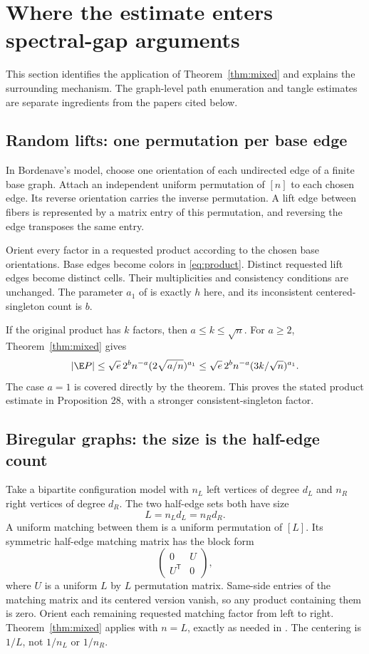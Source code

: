 \section{Where the estimate enters spectral-gap arguments}\label{sec:spectral}

This section identifies the application of Theorem~\ref{thm:mixed} and explains the surrounding mechanism. The graph-level path enumeration and tangle estimates are separate ingredients from the papers cited below.

\subsection{Random lifts: one permutation per base edge}

In Bordenave's model, choose one orientation of each undirected edge of a finite base graph. Attach an independent uniform permutation of $[n]$ to each chosen edge. Its reverse orientation carries the inverse permutation. A lift edge between fibers is represented by a matrix entry of this permutation, and reversing the edge transposes the same entry.

Orient every factor in a requested product according to the chosen base orientations. Base edges become colors in \eqref{eq:product}. Distinct requested lift edges become distinct cells. Their multiplicities and consistency conditions are unchanged. The parameter $a_1$ of \cite[Proposition 28]{Bordenave} is exactly $h$ here, and its inconsistent centered-singleton count is $b$.

If the original product has $k$ factors, then $a\le k\le\sqrt n$. For $a\ge2$, Theorem~\ref{thm:mixed} gives
\[
|\E P|\le\sqrt e\,2^bn^{-a}(2\sqrt{a/n})^{a_1}
\le\sqrt e\,2^bn^{-a}(3k/\sqrt n)^{a_1}.
\]
The case $a=1$ is covered directly by the theorem. This proves the stated product estimate in Proposition 28, with a stronger consistent-singleton factor.

\subsection{Biregular graphs: the size is the half-edge count}

Take a bipartite configuration model with $n_L$ left vertices of degree $d_L$ and $n_R$ right vertices of degree $d_R$. The two half-edge sets both have size
\[
L=n_Ld_L=n_Rd_R.
\]
A uniform matching between them is a uniform permutation of $[L]$. Its symmetric half-edge matching matrix has the block form
\[
\begin{pmatrix}0&U\\U^{\mathsf T}&0\end{pmatrix},
\]
where $U$ is a uniform $L$ by $L$ permutation matrix. Same-side entries of the matching matrix and its centered version vanish, so any product containing them is zero. Orient each remaining requested matching factor from left to right. Theorem~\ref{thm:mixed} applies with $n=L$, exactly as needed in \cite[preprint Lemma 7, published Lemma 5.6]{BDH}. The centering is $1/L$, not $1/n_L$ or $1/n_R$.

